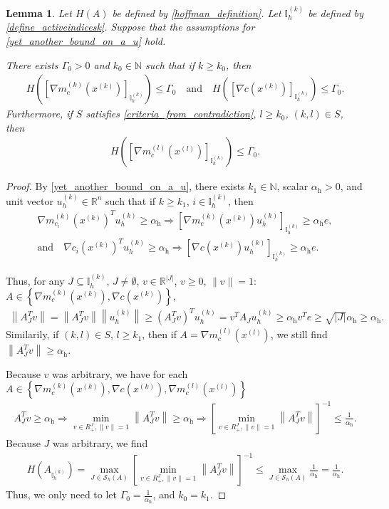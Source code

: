 \documentclass{article}
\newtheorem{lemma}[theorem]{Lemma}
\theoremstyle{case}
\numberwithin{theorem}{subsection}
\newcommand{\gmcik}{{\nabla m_{c_i}^{(k)}\left(\xk\right)}}
\newcommand{\huff}{{\Gamma_0}}
\newcommand{\naturals}{\mathbb N}
\newcommand{\Rn}{\mathbb R^n}
\newcommand{\xk}{x^{(k)}}
\newcommand{\xl}{{x^{(l)}}}
\newcommand{\activeindicesk}{{ \mathbb I_h^{(k)} }}
\newcommand{\minactivealpha}{{ \alpha_{\textrm{h}} }}
\newcommand{\activedirk}{{ u_{h}^{(k)} }}
\newcommand{\modeljack}{{ \nabla m^{(k)}_{c}\left(\xk\right) }}
\newcommand{\modeljacl}{{ \nabla m^{(l)}_{c}\left(\xl\right) }}
\newcommand{\truejack}{{ \nabla c\left(\xk\right) }}
\begin{document}
\begin{lemma}
\label{the_hoffman_constants_are_bounded}
Let $H(A)$ be defined by \cref{hoffman_definition}.
Let $\activeindicesk$ be defined by \cref{define_activeindicesk}.
Suppose that the assumptions for \cref{yet_another_bound_on_a_u} hold.

There exists $\huff > 0$ and $k_0 \in \naturals$ such that if $k \ge k_0$, then
\begin{align*}
H\left(\left[\modeljack\right]_{\activeindicesk}\right) \le \huff
\quad \textrm{and} \quad
H\left(\left[\truejack\right]_{\activeindicesk}\right) \le \huff.
\end{align*}
Furthermore, if $S$ satisfies \cref{criteria_from_contradiction}, $l \ge k_0$, $(k, l) \in S$, then
\begin{align*}
H\left(\left[\modeljacl\right]_{\activeindicesk}\right) \le \huff.
\end{align*}
\end{lemma}
\begin{proof}
By \cref{yet_another_bound_on_a_u}, 
there exists $k_1 \in \naturals$, scalar $\minactivealpha > 0$, and unit vector $\activedirk \in \Rn$ 
such that if $k \ge k_1$, $i \in \activeindicesk$, then
\begin{align*}
\gmcik^T \activedirk \ge \minactivealpha 
\Longrightarrow \left[\modeljack \activedirk \right]_{\activeindicesk} \ge \minactivealpha e, \\
\textrm{and} \quad
\nabla c_i\left(\xk\right)^T \activedirk \ge \minactivealpha
\Longrightarrow \left[\truejack \activedirk \right]_{\activeindicesk} \ge \minactivealpha e.
\end{align*}


Thus, for any $J \subseteq \activeindicesk$, $J \ne \emptyset$, $v \in \mathbb R^{|J|}$, $v \ge 0$, $\|v\| = 1$:
$A \in \left\{\modeljack,  \truejack  \right\}$,
 \begin{align*}
 \left\|A_J^Tv\right\| = \left\|A_J^Tv\right\| \left\|\activedirk\right\| \ge
\left(A_J^Tv\right)^T\activedirk
= v^TA_J \activedirk
\ge \minactivealpha v^Te
\ge \sqrt{|J|} \minactivealpha
\ge \minactivealpha .
\end{align*}
Similarily, if $(k, l) \in S$, $l \ge k_1$, then if $A = \modeljacl$, we still find
$\left\|A_J^Tv\right\| \ge \minactivealpha$.

Because $v$ was arbitrary, we have for each 
$A \in \left\{\modeljack,  \truejack,  \modeljacl  \right\}$
\begin{align*}
A_J^Tv \ge \minactivealpha 
\Longrightarrow \min_{v \in R^J_+, \|v\| = 1}  \left\|A_J^Tv\right\|\ge \minactivealpha
\Longrightarrow \left[\min_{v \in R^J_+, \|v\| = 1}  \left\|A_J^Tv\right\| \right]^{-1} \le \frac 1 {\minactivealpha}.
\end{align*}
Because $J$ was arbitrary, we find
\begin{align*}
H\left(A_{\activeindicesk}\right) 
= \max_{J \in \mathcal S_h(A)} \left[\min_{v \in R^J_+, \|v\| = 1}  \left\|A_J^Tv\right\| \right]^{-1}
\le \max_{J \in \mathcal S_h(A)} \frac 1 {\minactivealpha} = \frac 1 {\minactivealpha}.
\end{align*}
Thus, we only need to let $\huff = \frac 1 {\minactivealpha}$, and $k_0 = k_1$.
\end{proof}
\end{document}
